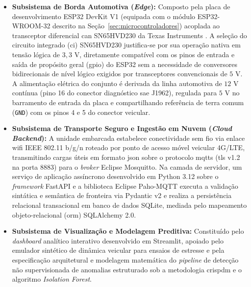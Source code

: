 \documentclass[
	12pt,				%
	openright,			%
	twoside,			%
	a4paper,			%
	english,			%
	brazil				%
	]{abntex2}
\begin{document}
\begin{itemize}
    \item \textbf{Subsistema de Borda Automotiva (\textit{Edge}):} Composto pela placa
        de desenvolvimento ESP32 DevKit V1 (equipada com o módulo ESP32-WROOM-32
        descrito
        na Seção~\ref{sec:microcontroladores}) acoplada ao transceptor diferencial
        \acrshort{can} SN65HVD230 da Texas Instruments \cite{ti_sn65hvd230}. A seleção
        do
        circuito integrado (\acrshort{ci}) SN65HVD230 justifica-se por sua operação
        nativa em tensão lógica de $3{,}3\text{ V}$, diretamente compatível com os pinos
        de entrada e saída de propósito geral (\acrshort{gpio}) do ESP32 sem a
        necessidade de conversores bidirecionais de nível lógico exigidos por
        transceptores convencionais de $5\text{ V}$. A alimentação elétrica do conjunto
        é
        derivada da linha automotiva de $12\text{ V}$ contínua (pino 16 do conector
        diagnóstico \acrshort{sae} J1962), regulada para $5\text{ V}$ no barramento de
        entrada da placa e compartilhando referência de terra comum (\texttt{GND}) com
        os pinos 4 e 5 do conector veicular.
    \item \textbf{Subsistema de Transporte Seguro e Ingestão em Nuvem (\textit{Cloud
        Backend}):} A unidade embarcada estabelece conectividade sem fio via enlace
        \acrshort{wifi} IEEE 802.11 b/g/n roteado por ponto de acesso móvel veicular
        4G/LTE, transmitindo cargas úteis em formato \acrshort{json} sobre o protocolo
        \acrshort{mqtts} (\acrshort{tls} v1.2 na porta 8883) para o \textit{broker}
        Eclipse Mosquitto. Na camada de servidor, um serviço de aplicação assíncrono
        desenvolvido em Python 3.12 sobre o \textit{framework} FastAPI e a biblioteca
        Eclipse Paho-MQTT executa a validação sintática e semântica de fronteira via
        Pydantic v2 e realiza a persistência relacional transacional em banco de dados
        SQLite, mediada pelo mapeamento objeto-relacional (\acrshort{orm}) SQLAlchemy
        2.0.
    \item \textbf{Subsistema de Visualização e Modelagem Preditiva:} Constituído pelo
        \textit{dashboard} analítico interativo desenvolvido em Streamlit, apoiado pelo
        emulador sintético de dinâmica veicular para ensaios de estresse e pela
        especificação arquitetural e modelagem matemática do \textit{pipeline} de
        detecção não supervisionada de anomalias estruturado sob a metodologia
        \acrshort{crispdm} e o algoritmo \textit{Isolation Forest}.
\end{itemize}
\end{document}
